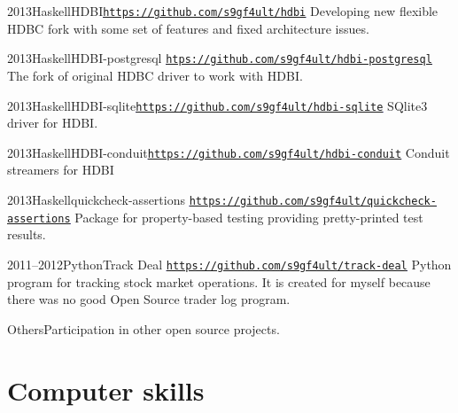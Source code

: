 \documentclass[11pt,a4paper,sans]{moderncv}        %
\newcommand*{\hlink}[1]{\textcolor{blue}{\texttt{\underline{\href{#1}{#1}}}}}
\begin{document}
\cventry
    {2013}{Haskell}{HDBI}{\hlink{https://github.com/s9gf4ult/hdbi}}{}
    {Developing new flexible HDBC fork with some set of features and fixed
      architecture issues.}

\cventry
    {2013}{Haskell}{HDBI-postgresql}%
    {\hlink{htps://github.com/s9gf4ult/hdbi-postgresql}}{}
    {The fork of original HDBC driver to work with HDBI.}

\cventry
    {2013}{Haskell}{HDBI-sqlite}{\hlink{https://github.com/s9gf4ult/hdbi-sqlite}}{}
    {SQlite3 driver for HDBI.}

\cventry    
    {2013}{Haskell}{HDBI-conduit}{\hlink{https://github.com/s9gf4ult/hdbi-conduit}}{}
    {Conduit streamers for HDBI}

\cventry
    {2013}{Haskell}{quickcheck-assertions}%
    {\hlink{https://github.com/s9gf4ult/quickcheck-assertions}}{}{%
      Package for property-based testing providing pretty-printed test results.}

\cventry
    {2011--2012}{Python}{Track Deal}%
    {\hlink{https://github.com/s9gf4ult/track-deal}}{}
    {Python program for tracking stock market operations. It is created for
      myself because there was no good Open Source trader log program.}

\cvitem
    {Others}{Participation in other open source projects.}


\section{Computer skills}

\end{document}

